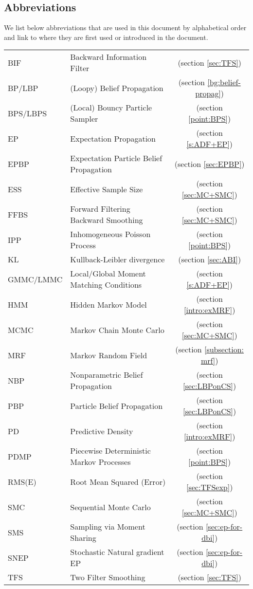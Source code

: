 \subsection*{Abbreviations}
We list below abbreviations that are used in this document by alphabetical order and link to where they are first used or introduced in the document.
\setlength{\tabcolsep}{12pt}
\renewcommand{\arraystretch}{1.2}
\begin{longtable}{llc}
BIF 			& Backward Information Filter &(section \ref{sec:TFS})\\
BP/LBP 		& (Loopy) Belief Propagation &(section \ref{bg:belief-propag})\\
BPS/LBPS 	& (Local) Bouncy Particle Sampler & (section \ref{point:BPS})\\
EP	 		& Expectation Propagation &(section \ref{s:ADF+EP})\\
EPBP 		& Expectation Particle Belief Propagation &(section \ref{sec:EPBP})\\
ESS 			& Effective Sample Size &(section \ref{sec:MC+SMC})\\
FFBS 		& Forward Filtering Backward Smoothing &(section \ref{sec:MC+SMC})\\
IPP 			& Inhomogeneous Poisson Process &(section \ref{point:BPS})\\
KL 			& Kullback-Leibler divergence & (section \ref{sec:ABI})\\
GMMC/LMMC	& Local/Global Moment Matching Conditions &(section \ref{s:ADF+EP})\\
HMM 		& Hidden Markov Model &(section \ref{intro:exMRF})\\
MCMC 		& Markov Chain Monte Carlo &(section \ref{sec:MC+SMC})\\
MRF 		& Markov Random Field &(section \ref{subsection: mrf})\\
NBP 			& Nonparametric Belief Propagation &(section \ref{sec:LBPonCS})\\
PBP	 		& Particle Belief Propagation &(section \ref{sec:LBPonCS})\\
PD 			& Predictive Density &(section \ref{intro:exMRF})\\
PDMP 		& Piecewise Deterministic Markov Processes & (section \ref{point:BPS})\\
RMS(E) 		& Root Mean Squared (Error) &(section \ref{sec:TFSexp})\\
SMC 		& Sequential Monte Carlo &(section \ref{sec:MC+SMC})\\
SMS 		& Sampling via Moment Sharing &(section \ref{sec:ep-for-dbi})\\
SNEP		& Stochastic Natural gradient EP &(section \ref{sec:ep-for-dbi})\\
TFS 			& Two Filter Smoothing &(section \ref{sec:TFS})\\ 
\end{longtable}
\setlength{\tabcolsep}{6pt} %
\newpage
